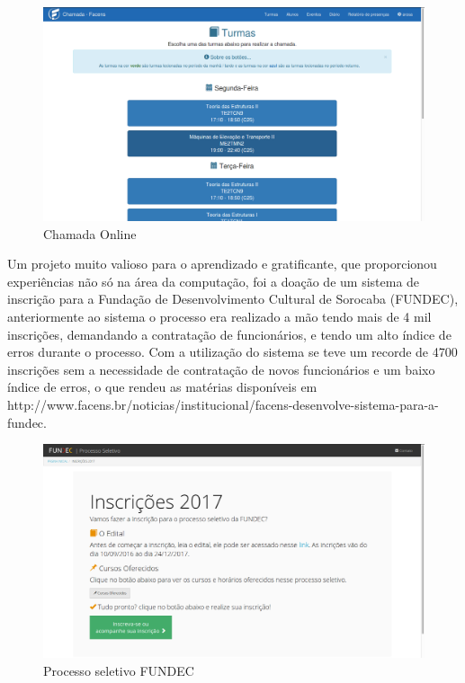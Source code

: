 \documentclass[
	12pt,				%
	oneside,			%
	a4paper,			%
	chapter=TITLE,		%
	section=TITLE,		%
	sumario=tradicional %
	english,			%
	french,				%
	spanish,			%
	brazil				%
	]{abntex2}
\begin{document}
\begin{figure}[htb]
	\caption{\label{fig:chamada} Chamada Online}
	\begin{center}
		\includegraphics[scale=0.3]{chamada}
	\end{center}
\end{figure}

Um projeto muito valioso para o aprendizado e gratificante, que proporcionou experiências não só na área da computação, foi a doação de um sistema de inscrição para a Fundação de Desenvolvimento Cultural de Sorocaba (FUNDEC), anteriormente ao sistema o processo era realizado a mão tendo mais de 4 mil inscrições, demandando a contratação de funcionários, e tendo um alto índice de erros durante o processo. Com a utilização do sistema se teve um recorde de 4700 inscrições sem a necessidade de contratação de novos funcionários e um baixo índice de erros, o que rendeu as matérias disponíveis em http://www.facens.br/noticias/institucional/facens-desenvolve-sistema-para-a-fundec. 

\begin{figure}[htb]
	\caption{\label{fig:fundec} Processo seletivo FUNDEC}
	\begin{center}
		\includegraphics[scale=0.3]{fundec}
	\end{center}
\end{figure}
\end{document}
